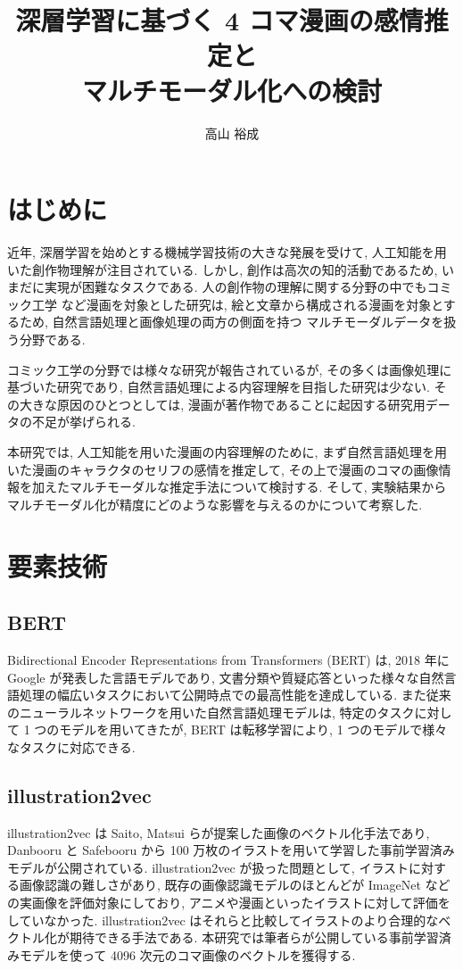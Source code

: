 \documentclass[a4paper,twoside,twocolumn,10pt]{jarticle}     %
\title{深層学習に基づく 4 コマ漫画の感情推定と\\マルチモーダル化への検討}
\author{高山 裕成}
\begin{document}
\maketitle %
\small

\section{はじめに}
近年, 深層学習を始めとする機械学習技術の大きな発展を受けて, 人工知能を用いた創作物理解が注目されている.
しかし, 創作は高次の知的活動であるため, いまだに実現が困難なタスクである.
人の創作物の理解に関する分野の中でもコミック工学 など漫画を対象とした研究は,
絵と文章から構成される漫画を対象とするため, 自然言語処理と画像処理の両方の側面を持つ
マルチモーダルデータを扱う分野である.

コミック工学の分野では様々な研究が報告されているが,
その多くは画像処理に基づいた研究であり,
自然言語処理による内容理解を目指した研究は少ない.
その大きな原因のひとつとしては, 漫画が著作物であることに起因する研究用データの不足が挙げられる.

本研究では, 人工知能を用いた漫画の内容理解のために,
まず自然言語処理を用いた漫画のキャラクタのセリフの感情を推定して,
その上で漫画のコマの画像情報を加えたマルチモーダルな推定手法について検討する.
そして, 実験結果からマルチモーダル化が精度にどのような影響を与えるのかについて考察した.
\section{要素技術}
\subsection{BERT}
Bidirectional Encoder Representations from Transformers (BERT)
 \cite{devlin2018bert} は, 2018 年に Google が発表した言語モデルであり,
 文書分類や質疑応答といった様々な自然言語処理の幅広いタスクにおいて公開時点での最高性能を達成している. また従来のニューラルネットワークを用いた自然言語処理モデルは, 特定のタスクに対して 1 つのモデルを用いてきたが, BERT は転移学習により, 1 つのモデルで様々なタスクに対応できる.

\subsection{illustration2vec}
illustration2vec \cite{i2v} は Saito, Matsui らが提案した画像のベクトル化手法であり, Danbooru と Safebooru から 100 万枚のイラストを用いて学習した事前学習済みモデルが公開されている. illustration2vec が扱った問題として, イラストに対する画像認識の難しさがあり, 既存の画像認識モデルのほとんどが ImageNet などの実画像を評価対象にしており, アニメや漫画といったイラストに対して評価をしていなかった. illustration2vec はそれらと比較してイラストのより合理的なベクトル化が期待できる手法である. 本研究では筆者らが公開している事前学習済みモデルを使って 4096 次元のコマ画像のベクトルを獲得する.
\end{document}
